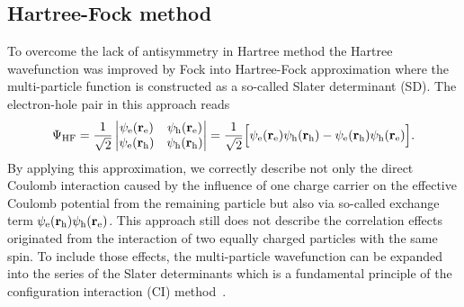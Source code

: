 \subsection{Hartree-Fock method}
To overcome the lack of antisymmetry in Hartree method the Hartree wavefunction was improved by Fock into Hartree-Fock approximation where the multi-particle function is constructed as a so-called Slater determinant (SD). The electron-hole pair in this approach reads 
%
\begin{equation}
\Psi_\mathrm{HF}=\frac{1}{\sqrt{2}}\begin{vmatrix}
\psi_{\rm{e}}(\mathbf{r}_{\rm{e}})&\psi_{\rm{h}}(\mathbf{r}_{\rm{e}})\\
\psi_{\rm{e}}(\mathbf{r}_{\rm{h}})&\psi_{\rm{h}}(\mathbf{r}_{\rm{h}})\\
\end{vmatrix}=\frac{1}{\sqrt{2}}\Big[\psi_{\rm{e}}(\mathbf{r}_{\rm{e}})\psi_{\rm{h}}(\mathbf{r}_{\rm{h}})-\psi_{\rm{e}}(\mathbf{r}_{\rm{h}})\psi_{\rm{h}}(\mathbf{r}_{\rm{e}})\Big].
\end{equation}
%
By applying this approximation, we correctly describe not only the direct Coulomb interaction caused by the influence of one charge carrier on the effective Coulomb potential from the remaining particle but also via so-called exchange term $\psi_{\rm{e}}(\mathbf{r}_{\rm{h}}) \psi_{\rm{h}}(\mathbf{r}_{\rm{e}})$. This approach still does not describe the correlation effects originated from the interaction of two equally charged particles with the same spin. To include those effects, the multi-particle wavefunction can be expanded into the series of the Slater determinants which is a fundamental principle of the configuration interaction (CI) method~\citep{t_stier}.

